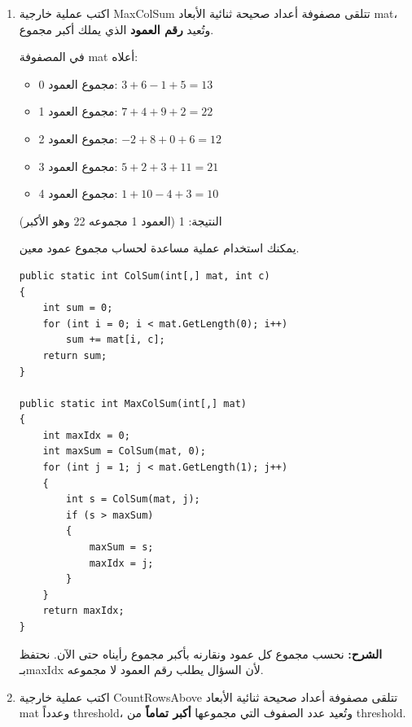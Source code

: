 \documentclass[14pt]{extarticle}
\begin{document}
\begin{enumerate}[itemsep=2em]

\item
اكتب عملية خارجية \textenglish{MaxColSum} تتلقى مصفوفة أعداد صحيحة ثنائية الأبعاد \textenglish{mat}، وتُعيد \textbf{رقم العمود} الذي يملك أكبر مجموع.

\begin{boxExample}
في المصفوفة \textenglish{mat} أعلاه:
\begin{itemize}[itemsep=1pt]
    \item مجموع العمود 0: $3+6-1+5=13$
    \item مجموع العمود 1: $7+4+9+2=22$
    \item مجموع العمود 2: $-2+8+0+6=12$
    \item مجموع العمود 3: $5+2+3+11=21$
    \item مجموع العمود 4: $1+10-4+3=10$
\end{itemize}
النتيجة: \textenglish{1} (العمود 1 مجموعه 22 وهو الأكبر)
\end{boxExample}

\begin{boxHint}
يمكنك استخدام عملية مساعدة لحساب مجموع عمود معين.
\end{boxHint}

\ifwithsols
\begin{boxSolution}
\begin{boxCode}
\begin{english}
\begin{verbatim}
public static int ColSum(int[,] mat, int c)
{
    int sum = 0;
    for (int i = 0; i < mat.GetLength(0); i++)
        sum += mat[i, c];
    return sum;
}

public static int MaxColSum(int[,] mat)
{
    int maxIdx = 0;
    int maxSum = ColSum(mat, 0);
    for (int j = 1; j < mat.GetLength(1); j++)
    {
        int s = ColSum(mat, j);
        if (s > maxSum)
        {
            maxSum = s;
            maxIdx = j;
        }
    }
    return maxIdx;
}
\end{verbatim}
\end{english}
\end{boxCode}
\textbf{الشرح:} نحسب مجموع كل عمود ونقارنه بأكبر مجموع رأيناه حتى الآن. نحتفظ بـ\textenglish{maxIdx} لأن السؤال يطلب رقم العمود لا مجموعه.
\end{boxSolution}
\clearpage
\fi

\item
اكتب عملية خارجية \textenglish{CountRowsAbove} تتلقى مصفوفة أعداد صحيحة ثنائية الأبعاد \textenglish{mat} وعدداً \textenglish{threshold}، وتُعيد عدد الصفوف التي مجموعها \textbf{أكبر تماماً} من \textenglish{threshold}.


\end{enumerate}
\end{document}
